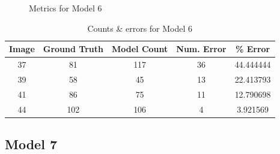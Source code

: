 \begin{appendices}
\begin{figure}[h!]
\caption{Metrics for Model 6}
\end{figure}

\begin{table}[h!]
\centering
\begin{tabular}{||c c c c c||} 
\hline
Image &  Ground Truth &  Model Count &  Num. Error &    \% Error \\
\hline\hline
37 &            81 &          117 &          36 &  44.444444 \\
39 &            58 &           45 &          13 &  22.413793 \\
41 &            86 &           75 &          11 &  12.790698 \\
44 &           102 &          106 &           4 &   3.921569 \\
\hline
\end{tabular}
\caption{Counts \& errors for Model 6}
\label{count_6}
\end{table}

\subsection{Model 7}


\end{appendices}
